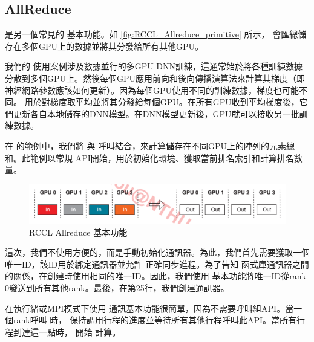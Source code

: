 \subsection{AllReduce}

 是另一個常見的 基本功能。如 \autoref{fig:RCCL_Allreduce_primitive} 所示， 會匯總儲存在多個GPU上的數據並將其分發給所有其他GPU。

我們的 使用案例涉及數據並行的多GPU DNN訓練，這通常始於將各種訓練數據分散到多個GPU上。然後每個GPU應用前向和後向傳播演算法來計算其梯度（即神經網路參數應該如何更新）。因為每個GPU使用不同的訓練數據，梯度也可能不同。 用於對梯度取平均並將其分發給每個GPU。在所有GPU收到平均梯度後，它們更新各自本地儲存的DNN模型。在DNN模型更新後，GPU就可以接收另一批訓練數據。

在  的範例中，我們將 與 呼叫結合，來計算儲存在不同GPU上的陣列的元素總和。此範例以常規 API開始，用於初始化環境、獲取當前排名索引和計算排名數量。

\begin{figure}[h]
    \centering
    \includegraphics[width=0.75\linewidth]{FileAusiliari//Screenshots/Figure10-3.png}
    \caption{RCCL Allreduce 基本功能}
    \label{fig:RCCL_Allreduce_primitive}
\end{figure}

這次，我們不使用方便的，而是手動初始化通訊器。為此，我們首先需要獲取一個唯一ID，該ID用於綁定通訊器並允許 正確同步進程。為了告知 函式庫通訊器之間的關係，在創建時使用相同的唯一ID。因此，我們使用 基本功能將唯一ID從rank 0發送到所有其他rank。最後，在第25行，我們創建通訊器。

在執行緒或MPI模式下使用 通訊基本功能很簡單，因為不需要呼叫組API。當一個rank呼叫 時， 保持調用行程的進度並等待所有其他行程呼叫此API。當所有行程到達這一點時， 開始 計算。

